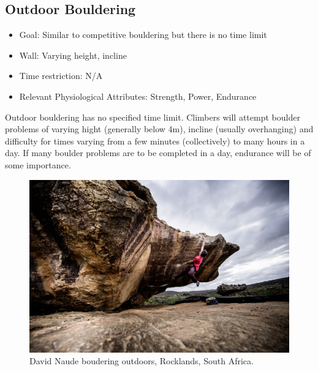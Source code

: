 \subsection{Outdoor Bouldering}
\begin{itemize}
    \item Goal: Similar to competitive bouldering but there is no time limit
    \item Wall: Varying height, incline
    \item Time restriction: N/A
    \item Relevant Physiological Attributes: Strength, Power, Endurance
    \end{itemize}
    Outdoor bouldering has no specified time limit. Climbers will attempt boulder problems of varying hight (generally below 4m), incline (usually overhanging) and difficulty for times varying from a few minutes (collectively) to many hours in a day. If many boulder problems are to be completed in a day, endurance will be of some importance.
    \begin{figure}[H]
        \centering
        \includegraphics[width=0.9\linewidth]{figs/outdoor_bouldering.jpg}
        \caption{David Naude boudering outdoors, Rocklands, South Africa. \citep{Simon_2020}}
    \end{figure}

